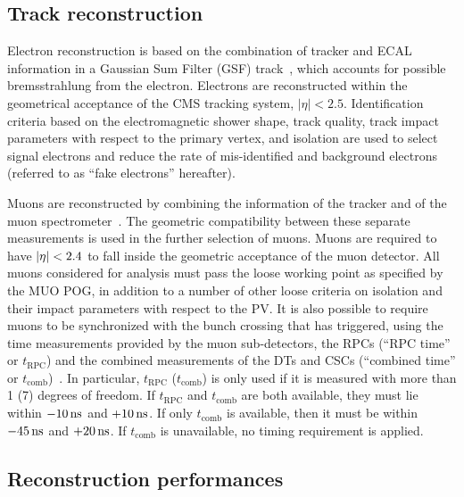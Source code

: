 \subsection{Track reconstruction} 
Electron reconstruction is based on the combination of tracker and
ECAL information in a Gaussian Sum Filter (GSF)
track~\cite{Khachatryan:2015hwa}, which accounts for possible
bremsstrahlung from the electron.
Electrons are reconstructed within the geometrical acceptance of the
CMS tracking system, $|\eta|<2.5$.
Identification criteria based on the electromagnetic shower shape, track
quality, track impact parameters with respect to the primary vertex,
and isolation are used to select signal electrons and reduce the rate
of mis-identified and background electrons (referred to as ``fake
electrons'' hereafter).

Muons are reconstructed by combining the information of the tracker
and of the muon
spectrometer~\cite{Sirunyan:2018fpa}.
The geometric compatibility between these separate measurements is
used in the further selection of muons. Muons are required to have
$|\eta|<2.4$ to fall inside the geometric acceptance of the muon
detector.
All muons considered for analysis must pass the loose working point as
specified by the MUO POG, in addition to a number
of other loose criteria on isolation and their impact parameters with
respect to the PV.
It is also possible to require muons to be synchronized with the bunch
crossing that has triggered, using the time measurements provided by
the muon sub-detectors, the RPCs (``RPC time'' or $t_{\mathrm{RPC}}$)
and the combined measurements of the DTs and CSCs (``combined time''
or $t_{\mathrm{comb}}$)~\cite{muon_oot}.
In particular, $t_{\mathrm{RPC}}$ ($t_{\mathrm{comb}}$) is only used
if it is measured with more than 1 (7) degrees of freedom.
If $t_{\mathrm{RPC}}$ and $t_{\mathrm{comb}}$ are both available,
they must lie within $-10\mathrm{\,ns}$ and $+10\mathrm{\,ns}$.
If only $t_{\mathrm{comb}}$ is available, then it must be within
$-45\mathrm{\,ns}$ and $+20\mathrm{\,ns}$.
If $t_{\mathrm{comb}}$ is unavailable, no timing requirement is
applied.

\subsection{Reconstruction performances}
\clearpage
